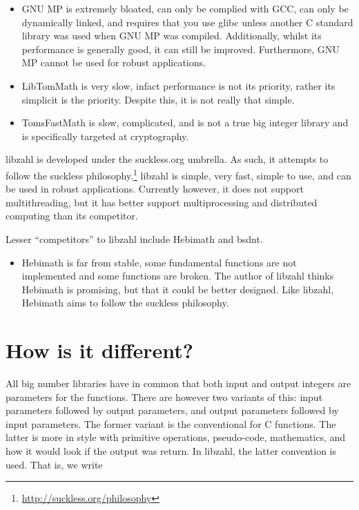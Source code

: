 \begin{itemize}
\item
GNU MP is extremely bloated, can only be complied with
GCC, can only be dynamically linked, and requires that
you use glibc unless another C standard library was used
when GNU MP was compiled. Additionally, whilst its
performance is generally good, it can still be improved.
Furthermore, GNU MP cannot be used for robust applications.

\item
LibTomMath is very slow, infact performance is not its
priority, rather its simplicit is the priority. Despite
this, it is not really that simple.

\item
TomsFastMath is slow, complicated, and is not a true
big integer library and is specifically targeted at
cryptography.
\end{itemize}

libzahl is developed under the suckless.org umbrella.
As such, it attempts to follow the suckless
philosophy.\footnote{\href{http://suckless.org/philosophy}
{http://suckless.org/philosophy}} libzahl is simple,
very fast, simple to use, and can be used in robust
applications. Currently however, it does not support
multithreading, but it has better support multiprocessing
and distributed computing than its competitor.

Lesser ``competitors'' to libzahl include Hebimath and
bsdnt.

\begin{itemize}
\item
Hebimath is far from stable, some fundamental functions
are not implemented and some functions are broken. The
author of libzahl thinks Hebimath is promising, but that
it could be better designed. Like libzahl, Hebimath aims
to follow the suckless philosophy.
\end{itemize}


\newpage
\section{How is it different?}
\label{sec:How is it different?}

All big number libraries have in common that both input
and output integers are parameters for the functions.
There are however two variants of this: input parameters
followed by output parameters, and output parameters
followed by input parameters. The former variant is the
conventional for C functions. The latter is more in style
with primitive operations, pseudo-code, mathematics, and
how it would look if the output was return. In libzahl,
the latter convention is used. That is, we write

